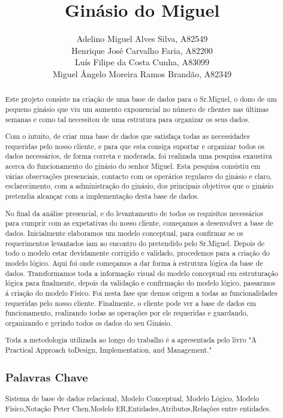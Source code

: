 \documentclass[a4paper, twoside]{report}
\title{Ginásio do Miguel}
\author{Adelino Miguel Alves Silva, A82549\\
        Henrique José Carvalho Faria, A82200\\
        Luís Filipe da Costa Cunha, A83099\\
        Miguel Ângelo Moreira Ramos Brandão, A82349}
\begin{document}


\renewcommand{\abstractname}{Resumo}

\begin{abstract}
Este projeto consiste na criação de uma base de dados para o Sr.Miguel, o dono de um pequeno ginásio que viu um aumento exponencial no número de clientes nas últimas semanas e como tal necessitou de uma estrutura para  organizar os seus dados.\par
Com o intuito, de criar uma base de dados que satisfaça todas as necessidades requeridas pelo nosso cliente, e para que esta consiga suportar e organizar todos os dados necessários, de forma correta e moderada, foi realizada uma pesquisa exaustiva acerca do funcionamento do ginásio do senhor Miguel. Esta pesquisa consistiu em várias observações presenciais, contacto com os operários regulares do ginásio e claro, esclarecimento, com a administração do ginásio, dos principais objetivos que o ginásio pretendia alcançar com a implementação desta base de dados.\par
No final da análise presencial, e do levantamento de todos os requisitos necessários para cumprir com as expetativas do nosso cliente, começamos a desenvolver a base de dados. Inicialmente elaboramos um modelo conceptual, para confirmar se os requerimentos levantados iam ao encontro do pretendido pelo Sr.Miguel. Depois de todo o modelo estar devidamente corrigido e validado, procedemos  para a criação do modelo lógico. Aqui foi onde começamos a dar forma à estrutura lógica da base de dados. Transformamos toda a informação visual do modelo conceptual em estruturação lógica para finalmente, depois da validação e confirmação do modelo lógico, passarmos á criação do modelo Físico. Foi nesta fase que demos origem a todas as funcionalidades requeridas pelo nosso cliente. Finalmente, o cliente pode ver a base de dados em funcionamento, realizando todas as operações por ele requeridas e guardando, organizando e gerindo todos os dados do seu Ginásio.

\par Toda a metodologia utilizada ao longo do trabalho é a apresentada pelo livro "A Practical Approach toDesign, Implementation, and Management."  \cite{dbsys} 

\subsection*{Palavras Chave}
Sistema de base de dados relacional, Modelo Conceptual, Modelo Lógico, Modelo Físico,Notação Peter Chen,Modelo ER,Entidades,Atributos,Relações entre entidades.

\end{abstract}
\end{document}
